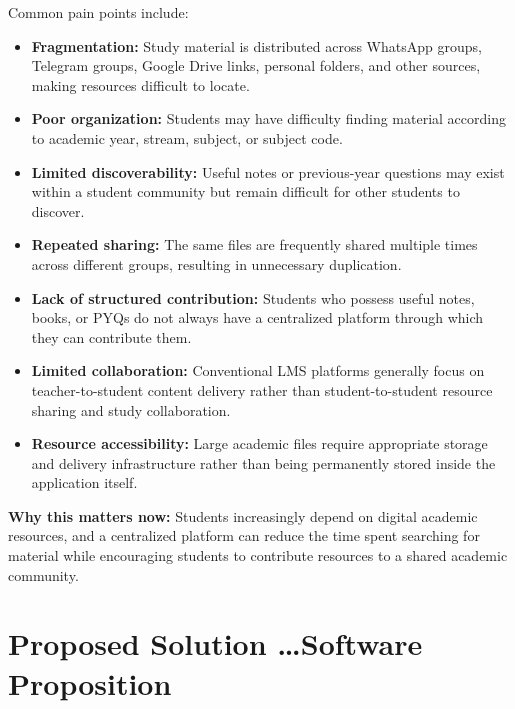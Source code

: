 \documentclass[11pt,a4paper]{article}
\begin{document}
Common pain points include:
\begin{itemize}[leftmargin=*]
    \item \textbf{Fragmentation:} Study material is distributed across WhatsApp groups, Telegram groups, Google Drive links, personal folders, and other sources, making resources difficult to locate.
    \item \textbf{Poor organization:} Students may have difficulty finding material according to academic year, stream, subject, or subject code.
    \item \textbf{Limited discoverability:} Useful notes or previous-year questions may exist within a student community but remain difficult for other students to discover.
    \item \textbf{Repeated sharing:} The same files are frequently shared multiple times across different groups, resulting in unnecessary duplication.
    \item \textbf{Lack of structured contribution:} Students who possess useful notes, books, or PYQs do not always have a centralized platform through which they can contribute them.
    \item \textbf{Limited collaboration:} Conventional LMS platforms generally focus on teacher-to-student content delivery rather than student-to-student resource sharing and study collaboration.
    \item \textbf{Resource accessibility:} Large academic files require appropriate storage and delivery infrastructure rather than being permanently stored inside the application itself.
\end{itemize}

\textbf{Why this matters now:} Students increasingly depend on digital academic resources, and a centralized platform can reduce the time spent searching for material while encouraging students to contribute resources to a shared academic community.

\section{Proposed Solution \dots Software Proposition}
\end{document}
